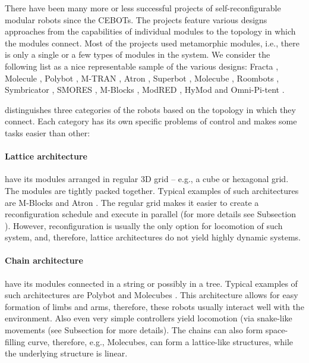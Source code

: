 There have been many more or less successful projects of self-reconfigurable
modular robots since the CEBOTs. The projects feature various designs approaches
from the capabilities of individual modules to the topology in which the modules
connect. Most of the projects used metamorphic modules, i.e., there is only a
single or a few types of modules in the system. We consider the following list
as a nice representable sample of the various designs: Fracta
\cite{DBLP:conf/icra/MurataKK94}, Molecule \cite{DBLP:conf/icra/KotayRVM98},
Polybot \cite{DBLP:conf/icra/YimDR00}, M-TRAN
\cite{DBLP:conf/icarcv/KurokawaKYTMK02}, Atron
\cite{DBLP:conf/iros/JorgensenOL04}, Superbot \cite{DBLP:conf/iros/SalemiMS06},
Molecube \cite{DBLP:journals/trob/ZykovMDL07}, Roombots
\cite{DBLP:conf/icra/SprowitzBDI09}, Symbricator
\cite{DBLP:journals/corr/abs-1109-2288}, SMORES \cite{DBLP:conf/iros/DaveyKY12},
M-Blocks \cite{DBLP:conf/iros/RomanishinGR13}, ModRED
\cite{DBLP:journals/ras/BacaHDND14}, HyMod \cite{DBLP:conf/dars/ParrottDG16} and
Omni-Pi-tent \cite{DBLP:conf/taros/PeckTT19}.

\textcite{4141032} distinguishes three categories of the robots based on the
topology in which they connect. Each category has its own specific problems of
control and makes some tasks easier than other:

\paragraph{Lattice architecture} have its modules arranged in regular 3D grid --
e.g., a cube or hexagonal grid. The modules are tightly packed together. Typical
examples of such architectures are M-Blocks \cite{DBLP:conf/iros/RomanishinGR13}
and Atron \cite{DBLP:conf/iros/JorgensenOL04}. The regular grid makes it easier
to create a reconfiguration schedule and execute in parallel (for more details
see Subsection ). However, reconfiguration is usually the only option
for locomotion of such system, and, therefore, lattice architectures do not
yield highly dynamic systems.

\paragraph{Chain architecture} have its modules connected in a string or
possibly in a tree. Typical examples of such architectures are Polybot
\cite{DBLP:conf/icra/YimDR00} and Molecubes
\cite{DBLP:journals/trob/ZykovMDL07}. This architecture allows for easy
formation of limbs and arms, therefore, these robots usually interact well with
the environment. Also even very simple controllers yield locomotion (via
snake-like movements (see Subsection  for more details). The chains
can also form space-filling curve, therefore, e.g., Molecubes, can form a
lattice-like structures, while the underlying structure is linear.

